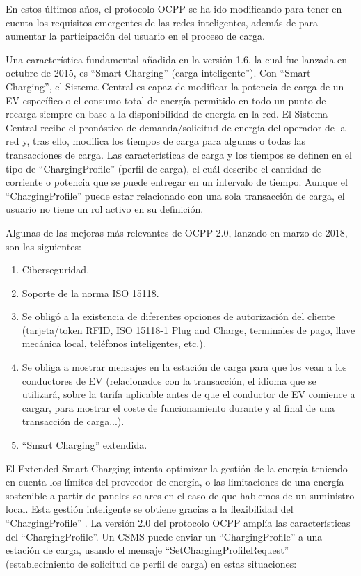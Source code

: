 \documentclass[12pt,a4paper,onecolumn,oneside]{report}
\begin{document}
En estos últimos años, el protocolo OCPP se ha ido modificando para tener en cuenta los requisitos emergentes de las redes inteligentes, además de para aumentar la participación del usuario en el proceso de carga.

Una característica fundamental añadida en la versión 1.6, la cual fue lanzada en octubre de 2015, es ``Smart Charging” (carga inteligente”). Con ``Smart Charging”,  el Sistema Central es capaz de modificar la potencia de carga de un EV específico o el consumo total de energía permitido en todo un punto de recarga siempre en base a la disponibilidad de energía en la red. El Sistema Central recibe el pronóstico de demanda/solicitud de energía del operador de la red y, tras ello, modifica los tiempos de carga para algunas o todas las transacciones de carga. Las características de carga y los tiempos se definen en el tipo de ``ChargingProfile” (perfil de carga), el cuál describe el cantidad de corriente o potencia que se puede entregar en un intervalo de tiempo. Aunque el ``ChargingProfile” puede estar relacionado con una sola transacción de carga, el usuario no tiene un rol activo en su definición.

Algunas de las mejoras más relevantes de OCPP 2.0, lanzado en marzo de 2018, son las siguientes:

\begin{enumerate}

\item Ciberseguridad.
\item Soporte de la norma ISO 15118.
\item Se obligó a la existencia de diferentes opciones de autorización del cliente (tarjeta/token RFID, ISO 15118-1 Plug and Charge, terminales de pago, llave mecánica local, teléfonos inteligentes, etc.).
\item Se obliga a mostrar mensajes en la estación de carga para que los vean a los conductores de EV (relacionados con la transacción, el idioma que se utilizará, sobre la tarifa aplicable antes de que el conductor de EV comience a cargar, para mostrar el coste de funcionamiento durante y al final de una transacción de carga...).
\item ``Smart Charging” extendida.

\end{enumerate}

El Extended Smart Charging intenta optimizar la gestión de la energía teniendo en cuenta los límites del proveedor de energía, o las limitaciones de una energía sostenible a partir de paneles solares en el caso de que hablemos de un suministro local. Esta gestión inteligente se obtiene gracias a la flexibilidad del ``ChargingProfile” . La versión 2.0 del protocolo OCPP amplía las características del ``ChargingProfile”. Un CSMS puede enviar un ``ChargingProfile” a una estación de carga, usando el mensaje ``SetChargingProfileRequest” (establecimiento de solicitud de perfil de carga) en estas situaciones:
\end{document}
